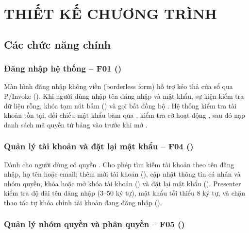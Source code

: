 \chapter{THIẾT KẾ CHƯƠNG TRÌNH}

\section{Các chức năng chính}

\subsection{Đăng nhập hệ thống – F01 (\texorpdfstring{}{LoginForm.cs})}

Màn hình đăng nhập không viền (borderless form) hỗ trợ kéo thả cửa sổ qua P/Invoke  (). Khi người dùng nhập tên đăng nhập và mật khẩu, sự kiện  kiểm tra dữ liệu rỗng, khóa tạm nút bấm () và gọi bất đồng bộ . Hệ thống kiểm tra tài khoản tồn tại, đối chiếu mật khẩu băm qua , kiểm tra cờ hoạt động , sau đó nạp danh sách mã quyền từ bảng  vào  trước khi mở .


\subsection{Quản lý tài khoản và đặt lại mật khẩu – F04 (\texorpdfstring{}{UserPage.cs})}

Dành cho người dùng có quyền . Cho phép tìm kiếm tài khoản theo tên đăng nhập, họ tên hoặc email; thêm mới tài khoản (), cập nhật thông tin cá nhân và nhóm quyền, khóa hoặc mở khóa tài khoản () và đặt lại mật khẩu (). Presenter  kiểm tra độ dài tên đăng nhập (3–50 ký tự), mật khẩu tối thiểu 8 ký tự, và chặn thao tác tự khóa chính tài khoản đang đăng nhập ().


\subsection{Quản lý nhóm quyền và phân quyền – F05 (\texorpdfstring{}{RolePage.cs})}

